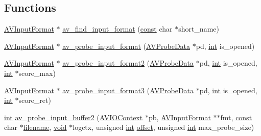 \subsection*{Functions}
\begin{DoxyCompactItemize}
\item 
\hyperlink{struct_a_v_input_format}{A\+V\+Input\+Format} $\ast$ \hyperlink{group__lavf__decoding_ga7d2f532c6653c2419b17956712fdf3da}{av\+\_\+find\+\_\+input\+\_\+format} (\hyperlink{getopt1_8c_a2c212835823e3c54a8ab6d95c652660e}{const} char $\ast$short\+\_\+name)
\item 
\hyperlink{struct_a_v_input_format}{A\+V\+Input\+Format} $\ast$ \hyperlink{group__lavf__decoding_gad8a1268228fff3aeae0aeaa99a767a24}{av\+\_\+probe\+\_\+input\+\_\+format} (\hyperlink{struct_a_v_probe_data}{A\+V\+Probe\+Data} $\ast$pd, \hyperlink{xmltok_8h_a5a0d4a5641ce434f1d23533f2b2e6653}{int} is\+\_\+opened)
\item 
\hyperlink{struct_a_v_input_format}{A\+V\+Input\+Format} $\ast$ \hyperlink{group__lavf__decoding_gae8b938f6e7c3741dd27a6c171e72f33d}{av\+\_\+probe\+\_\+input\+\_\+format2} (\hyperlink{struct_a_v_probe_data}{A\+V\+Probe\+Data} $\ast$pd, \hyperlink{xmltok_8h_a5a0d4a5641ce434f1d23533f2b2e6653}{int} is\+\_\+opened, \hyperlink{xmltok_8h_a5a0d4a5641ce434f1d23533f2b2e6653}{int} $\ast$score\+\_\+max)
\item 
\hyperlink{struct_a_v_input_format}{A\+V\+Input\+Format} $\ast$ \hyperlink{group__lavf__decoding_ga7e4318244afd6c5fe55cec75d27258b2}{av\+\_\+probe\+\_\+input\+\_\+format3} (\hyperlink{struct_a_v_probe_data}{A\+V\+Probe\+Data} $\ast$pd, \hyperlink{xmltok_8h_a5a0d4a5641ce434f1d23533f2b2e6653}{int} is\+\_\+opened, \hyperlink{xmltok_8h_a5a0d4a5641ce434f1d23533f2b2e6653}{int} $\ast$score\+\_\+ret)
\item 
\hyperlink{xmltok_8h_a5a0d4a5641ce434f1d23533f2b2e6653}{int} \hyperlink{group__lavf__decoding_ga69e44bd9ade0160a8cd6196aa37505ea}{av\+\_\+probe\+\_\+input\+\_\+buffer2} (\hyperlink{struct_a_v_i_o_context}{A\+V\+I\+O\+Context} $\ast$pb, \hyperlink{struct_a_v_input_format}{A\+V\+Input\+Format} $\ast$$\ast$fmt, \hyperlink{getopt1_8c_a2c212835823e3c54a8ab6d95c652660e}{const} char $\ast$\hyperlink{test__portburn_8cpp_a7efa5e9c7494c7d4586359300221aa5d}{filename}, \hyperlink{sound_8c_ae35f5844602719cf66324f4de2a658b3}{void} $\ast$logctx, unsigned \hyperlink{xmltok_8h_a5a0d4a5641ce434f1d23533f2b2e6653}{int} \hyperlink{layer12_8c_a33d71f23ba2052d17f0b754dc35265b0}{offset}, unsigned \hyperlink{xmltok_8h_a5a0d4a5641ce434f1d23533f2b2e6653}{int} max\+\_\+probe\+\_\+size)
$$
\end{DoxyCompactItemize}
